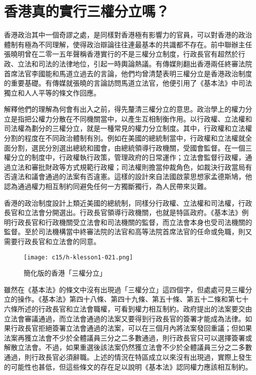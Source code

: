 \section{香港真的實行三權分立嗎？}

香港政治其中一個奇謬之處，是同樣對香港極有影響力的官員，可以對香港的政治體制有極為不同理解，使得政治辯論往往連最基本的共識都不存在。前中聯辦主任張曉明曾在二零一五年聲稱香港實行的不是三權分立制度，行政長官有超然於行政、立法和司法的法律地位，引起一時輿論熱議。有傳媒則翻出香港兩任終審法院首席法官李國能和馬道立過去的言論，他們均曾清楚表明三權分立是香港政治制度的重要基礎。有傳媒就張曉的言論訪問馬道立法官，他便引用了《基本法》中司法獨立和人人平等的條文作回應。

解釋他們的理解為何會有出入之前，得先釐清三權分立的意思。政治學上的權力分立是指把公權力分散在不同機關當中，以產生互相制衡作用。以行政權、立法權和司法權為劃分的三權分立，就是一種常見的權力分立制度。其中，行政權和立法權分割的程度在不同政治體制有別。例如在美國的總統制當中，行政權和立法權就全面分割，選民分別選出總統和國會，由總統領導行政機關，受國會監督。在一個三權分立的制度中，行政權執行政策，管理政府的日常運作；立法會監督行政權，通過立法和審批財政等方式規範行政權；司法權則擔當仲裁角色，如裁決行政當局有否違法和議會通過的法案有否違憲。這樣的設計來自法國啟蒙思想家孟德斯鳩，他認為通過權力相互制約同避免任何一方獨斷獨行，為人民帶來災難。

香港的政治制度設計上類近美國的總統制，同樣分行政權、立法權和司法權，行政長官和立法會分開選出。行政長官領導行政機關，也就是特區政府。《基本法》例明行政長官和行政機關受立法會和司法機關的監督，而立法會本身也受司法機關的監督。至於司法機構當中終審法院的法官和高等法院首席法官的任命或免職，則又需要行政長官和立法會的同意。

\begin{figure}[htbp]
    \centering
    \texttt{[image: c15/h-klesson1-021.png]}
    \caption{簡化版的香港「三權分立」} 
\end{figure}

雖然在《基本法》的條文中沒有出現過「三權分立」這四個字，但處處可見三權分立的操作。《基本法》第四十八條、第四十九條、第五十條、第五十二條和第七十六條所述的行政長官和立法會職權，可看到權力相互制約。政府提出的法案要交由立法會審議通過，而立法會通過的法案又要得到行政長官的簽署才能成為法律。如果行政長官拒絕簽署立法會通過的法案，可以在三個月內將法案發回重議；但如果法案再獲立法會不少於全體議員三分之二多數通過，則行政長官只可以選擇簽署或解散立法會。不過，如果重選後該法案仍然獲立法會不少於全體議員三分之二多數通過，則行政長官必須辭職。上述的情況在特區成立以來沒有出現過，實際上發生的可能性也甚低，但這些條文的存在足以說明《基本法》認同權力應該相互制約。

